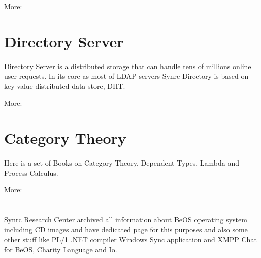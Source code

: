 \documentclass[11pt]{article}
\begin{document}
More: 

\section*{Directory Server}
\paragraph{}
Directory Server is a distributed storage that can handle tens of
millions online user requests. 
In its core as most of LDAP servers Synrc Directory is based on
key-value distributed data store, DHT.

More: 


\section*{Category Theory}
\paragraph{}
Here is a set of Books on Category Theory, Dependent Types, Lambda and Process Calculus.

More: 

\section*{}
\paragraph{}
Synrc Research Center archived all information about BeOS operating system 
including CD images and have dedicated page for this purposes and also some
other stuff like PL/1 .NET compiler Windows Sync application and XMPP Chat for BeOS, Charity Language and Io.





\end{document}
